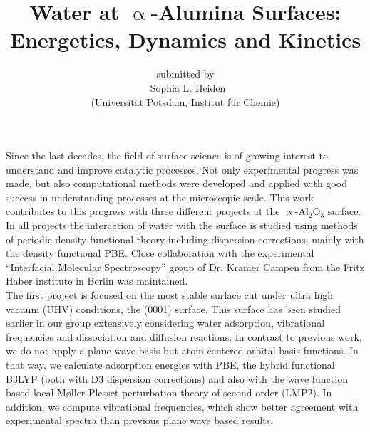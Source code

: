 \documentclass[11pt,DIV=13,a4paper,headinclude]{scrartcl}
\begin{document}
\titlehead{\centering\normalfont\large\scshape Scientific Abstract}
\title{\Large\vspace{-\baselineskip} Water at $\upalpha$-Alumina Surfaces:\\
  Energetics, Dynamics and Kinetics\vspace{0\baselineskip}}
\author{\large\sffamily submitted by\\
  \Large\textbf\sffamily\ Sophia L. Heiden\\
  \large\sffamily (Universit\"{a}t Potsdam, Institut f\"{u}r Chemie)}
\date{}

\maketitle

Since the last decades, the field of surface science is of growing interest to understand and improve catalytic processes.
Not only experimental progress was made, but also computational methods were developed and applied with good success in understanding processes at the microscopic scale.
This work contributes to this progress with three different projects at the $\upalpha$-Al$_2$O$_3$ surface.
In all projects the interaction of water with the surface is studied using methods of periodic density functional theory including dispersion corrections, mainly with the density functional PBE.
Close collaboration with the experimental ``Interfacial Molecular Spectroscopy'' group of Dr. Kramer Campen from the Fritz Haber institute in Berlin was maintained.
\\


The first project is focused on the most stable surface cut under ultra high vacuum (UHV) conditions, the (0001) surface.
This surface has been studied earlier in our group extensively considering water adsorption, vibrational frequencies and dissociation and diffusion reactions.
In contrast to previous work, we do not apply a plane wave basis but atom centered orbital basis functions.
In that way, we calculate adsorption energies with PBE, the hybrid functional B3LYP (both with D3 dispersion corrections) and also with the wave function based local M\o{}ller-Plesset perturbation theory of second order (LMP2).
In addition, we compute vibrational frequencies, which show better agreement with experimental spectra than previous plane wave based results.
\end{document}
